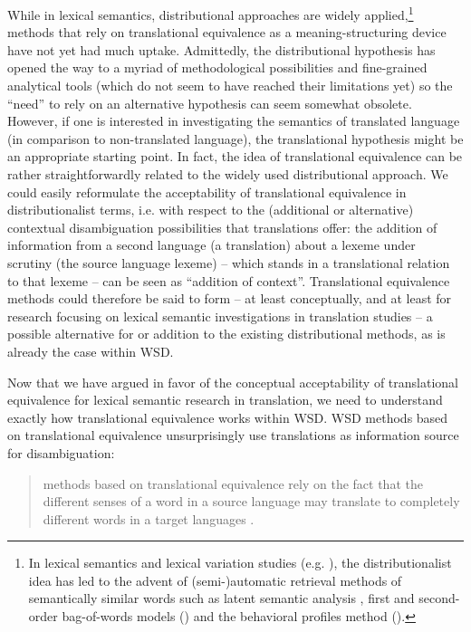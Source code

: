 While in lexical semantics, distributional approaches are widely applied,\footnote{In lexical semantics and lexical variation studies (e.g. \citealt{peirsman_automatic_2010}), the distributionalist idea has led to the advent of (semi-)automatic retrieval methods of semantically similar words such as latent semantic analysis \citep{landauer_solution_1997}, first and second-order bag-of-words models (\citealt{manning_foundations_1999}) and the behavioral profiles method (\citealt{divjak_ways_2006, evans_behavioral_2009}).} methods that rely on translational equivalence as a meaning-structuring device have not yet had much uptake. Admittedly, the distributional hypothesis has opened the way to a myriad of methodological possibilities and fine-grained analytical tools (which do not seem to have reached their limitations yet) so the ``need'' to rely on an alternative hypothesis can seem somewhat obsolete. However, if one is interested in investigating the semantics of translated language (in comparison to non-translated language), the translational hypothesis might be an appropriate starting point. In fact, the idea of translational equivalence can be rather straightforwardly related to the widely used distributional approach. We could easily reformulate the acceptability of translational equivalence in distributionalist terms, i.e. with respect to the (additional or alternative) contextual disambiguation possibilities that translations offer: the addition of information from a second language (a translation) about a lexeme under scrutiny (the source language lexeme) – which stands in a translational relation to that lexeme – can be seen as ``addition of context''. Translational equivalence methods could therefore be said to form – at least conceptually, and at least for research focusing on lexical semantic investigations in translation studies – a possible alternative for or addition to the existing distributional methods, as is already the case within WSD.

Now that we have argued in favor of the conceptual acceptability of translational equivalence for lexical semantic research in translation, we need to understand exactly how translational equivalence works within WSD. WSD methods based on translational equivalence unsurprisingly use translations as information source for disambiguation:

\begin{quote}
methods based on translational equivalence rely on the fact that the different senses of a word in a source language may translate to completely different words in a target languages \citep[134]{agirre_unsupervised_2007}.
\end{quote}

